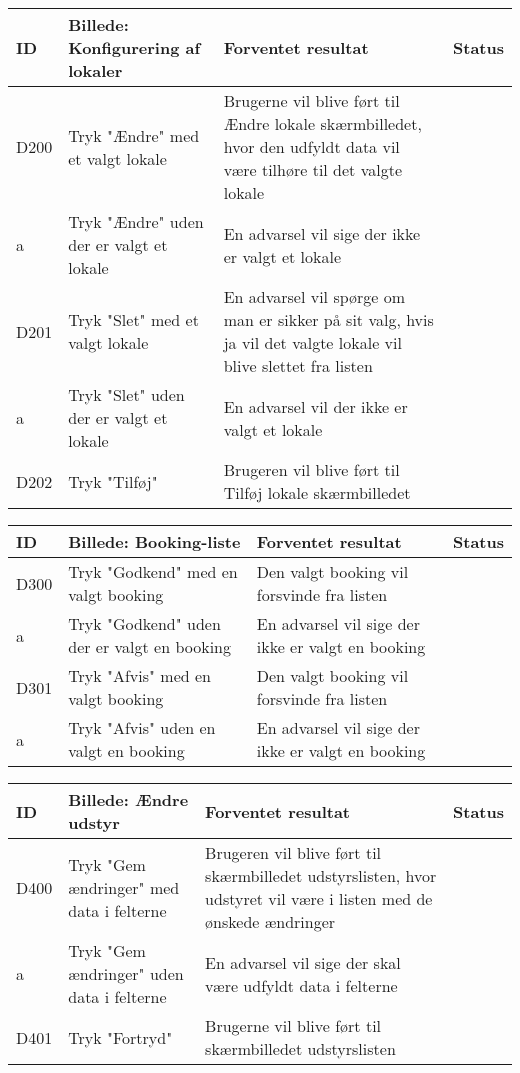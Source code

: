 \begin{tabularx}{\textwidth}{ |X|X|X|X| }
\hline
	ID & Billede: Konfigurering af lokaler & Forventet resultat & Status\\ 
\hline
	D200 & Tryk "Ændre" med et valgt lokale & Brugerne vil blive ført til Ændre lokale skærmbilledet, hvor den udfyldt data vil være tilhøre til det valgte lokale & \\
\hline
	a & Tryk "Ændre" uden der er valgt et lokale & En advarsel vil sige der ikke er valgt et lokale & \\
\hline
	D201 & Tryk "Slet" med et valgt lokale &En advarsel vil spørge om man er sikker på sit valg, hvis ja vil det valgte lokale vil blive slettet fra listen & \\
\hline
	a & Tryk "Slet" uden der er valgt et lokale & En advarsel vil der ikke er valgt et lokale & \\
\hline
	D202 & Tryk "Tilføj" & Brugeren vil blive ført til Tilføj lokale skærmbilledet & \\
\hline
\end{tabularx}

\begin{tabularx}{\textwidth}{ |X|X|X|X| }
\hline
	ID & Billede: Booking-liste  & Forventet resultat & Status\\ 
\hline
	D300 & Tryk "Godkend" med en valgt booking & Den valgt booking vil forsvinde fra listen & \\
\hline
	a & Tryk "Godkend" uden der er valgt en booking & En advarsel vil sige der ikke er valgt en booking & \\
\hline
	D301 & Tryk "Afvis" med en valgt booking & Den valgt booking vil forsvinde fra listen & \\
\hline
	a & Tryk "Afvis" uden en valgt en booking & En advarsel vil sige der ikke er valgt en booking & \\
\hline
\end{tabularx}

\begin{tabularx}{\textwidth}{ |X|X|X|X| }
\hline
	ID & Billede: Ændre udstyr & Forventet resultat & Status\\ 
\hline
	D400 & Tryk "Gem ændringer" med data i felterne & Brugeren vil blive ført til skærmbilledet udstyrslisten, hvor udstyret vil være i listen med de ønskede ændringer & \\
\hline
	a & Tryk "Gem ændringer" uden data i felterne & En advarsel vil sige der skal være udfyldt data i felterne & \\
\hline
	D401 & Tryk "Fortryd" & Brugerne vil blive ført til skærmbilledet udstyrslisten & \\
\hline
\end{tabularx}


